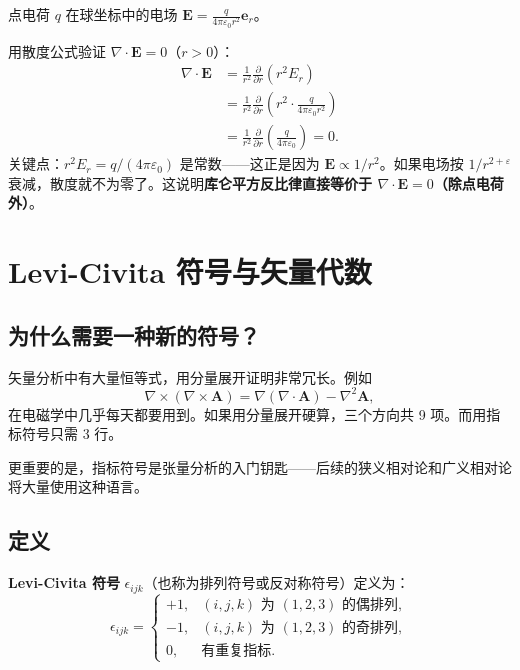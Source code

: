 \begin{example}
点电荷 $q$ 在球坐标中的电场 $\mathbf{E} = \frac{q}{4\pi\varepsilon_0 r^2}\mathbf{e}_r$。

用散度公式验证 $\nabla\cdot\mathbf{E}=0$（$r>0$）：
\begin{align*}
\nabla\cdot\mathbf{E}
&= \frac{1}{r^2}\frac{\partial}{\partial r}\left(r^2 E_r\right) \\
&= \frac{1}{r^2}\frac{\partial}{\partial r}\left(r^2\cdot\frac{q}{4\pi\varepsilon_0 r^2}\right) \\
&= \frac{1}{r^2}\frac{\partial}{\partial r}\left(\frac{q}{4\pi\varepsilon_0}\right) = 0.
\end{align*}
关键点：$r^2 E_r = q/(4\pi\varepsilon_0)$ 是常数——这正是因为 $\mathbf{E}\propto 1/r^2$。如果电场按 $1/r^{2+\varepsilon}$ 衰减，散度就不为零了。这说明\textbf{库仑平方反比律直接等价于 $\nabla\cdot\mathbf{E}=0$（除点电荷外）}。
\end{example}

\section{Levi-Civita 符号与矢量代数}

\subsection{为什么需要一种新的符号？}

矢量分析中有大量恒等式，用分量展开证明非常冗长。例如
\[
\nabla\times(\nabla\times\mathbf{A}) = \nabla(\nabla\cdot\mathbf{A}) - \nabla^2\mathbf{A},
\]
在电磁学中几乎每天都要用到。如果用分量展开硬算，三个方向共 9 项。而用指标符号只需 3 行。

更重要的是，指标符号是张量分析的入门钥匙——后续的狭义相对论和广义相对论将大量使用这种语言。

\subsection{定义}

\textbf{Levi-Civita 符号} $\epsilon_{ijk}$（也称为排列符号或反对称符号）定义为：
\[
\epsilon_{ijk} =
\begin{cases}
+1, & (i,j,k) \text{ 为 } (1,2,3)\text{ 的偶排列},\\
-1, & (i,j,k) \text{ 为 }(1,2,3)\text{ 的奇排列},\\
0, & \text{有重复指标}.
\end{cases}
\]

